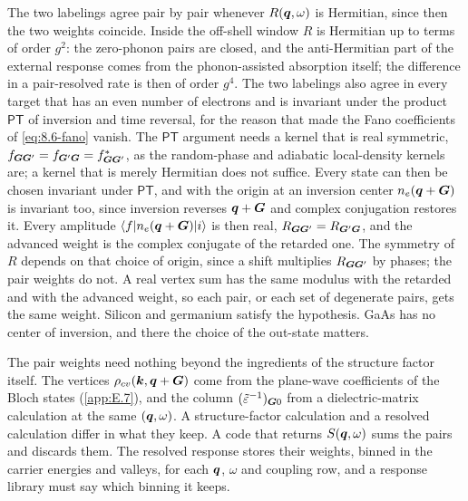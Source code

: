 The two labelings agree pair by pair whenever $R(\bm{q},\omega)$ is Hermitian, since then the two weights coincide. Inside the off-shell window $R$ is Hermitian up to terms of order $g^2$: the zero-phonon pairs are closed, and the anti-Hermitian part of the external response comes from the phonon-assisted absorption itself; the difference in a pair-resolved rate is then of order $g^4$. The two labelings also agree in every target that has an even number of electrons and is invariant under the product $\mathsf{P}\mathsf{T}$ of inversion and time reversal, for the reason that made the Fano coefficients of \cref{eq:8.6-fano} vanish. The $\mathsf{P}\mathsf{T}$ argument needs a kernel that is real symmetric, $f_{\bm{G}\bm{G}'} = f_{\bm{G}'\bm{G}} = f^*_{\bm{G}\bm{G}'}$, as the random-phase and adiabatic local-density kernels are; a kernel that is merely Hermitian does not suffice. Every state can then be chosen invariant under $\mathsf{P}\mathsf{T}$, and with the origin at an inversion center $n_e(\bm{q}+\bm{G})$ is invariant too, since inversion reverses $\bm{q}+\bm{G}$ and complex conjugation restores it. Every amplitude $\langle f|n_e(\bm{q}+\bm{G})|i\rangle$ is then real, $R_{\bm{G}\bm{G}'} = R_{\bm{G}'\bm{G}}$, and the advanced weight is the complex conjugate of the retarded one. The symmetry of $R$ depends on that choice of origin, since a shift multiplies $R_{\bm{G}\bm{G}'}$ by phases; the pair weights do not. A real vertex sum has the same modulus with the retarded and with the advanced weight, so each pair, or each set of degenerate pairs, gets the same weight. Silicon and germanium satisfy the hypothesis. GaAs has no center of inversion, and there the choice of the out-state matters.

The pair weights need nothing beyond the ingredients of the structure factor itself. The vertices $\rho_{cv}(\bm{k},\bm{q}+\bm{G})$ come from the plane-wave coefficients of the Bloch states (\cref{app:E.7}), and the column $(\tilde\varepsilon^{-1})_{\bm{G}0}$ from a dielectric-matrix calculation at the same $(\bm{q},\omega)$. A structure-factor calculation and a resolved calculation differ in what they keep. A code that returns $S(\bm{q},\omega)$ sums the pairs and discards them. The resolved response stores their weights, binned in the carrier energies and valleys, for each $\bm{q}$, $\omega$ and coupling row, and a response library must say which binning it keeps.

